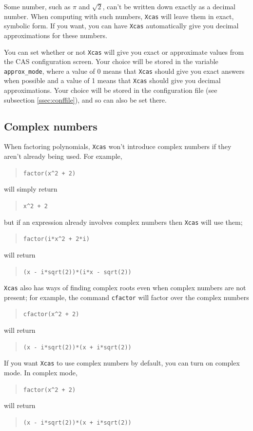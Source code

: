 \documentclass[a4paper,11pt]{book}
\newenvironment{giaccmd}
{\begin{quote}\ttfamily}
{\end{quote}}
\begin{document}
Some number, such as $\pi$ and $\sqrt{2}$, can't be written down
exactly as a decimal number.  When computing with such numbers,
\texttt{Xcas} will leave them in exact, symbolic form.  If you want,
you can have \texttt{Xcas} automatically give you decimal
approximations for these numbers.

You can set whether or not \texttt{Xcas} will give you exact or
approximate values from the CAS configuration screen.  Your choice will
be stored in the variable \texttt{approx\_mode}, where a value of 0
means that \texttt{Xcas} should give you exact answers when possible
and a value of 1 means that \texttt{Xcas} should give you decimal
approximations.  Your choice will be stored in the configuration file
(see subsection \ref{ssec:conffile}), and so can also be set there.

\subsection{Complex numbers}
\label{ssec:complex}

When factoring polynomials, \texttt{Xcas} won't introduce complex
numbers if they aren't already being used.  For example,
\begin{giaccmd}
  \texttt{factor(x\^{}2 + 2)}
\end{giaccmd}
will simply return
\begin{giaccmd}
  \texttt{x\^{}2 + 2}
\end{giaccmd}
but if an expression already involves complex numbers then
\texttt{Xcas} will use them;
\begin{giaccmd}
  \texttt{factor(i*x\^{}2 + 2*i)}
\end{giaccmd}
will return
\begin{giaccmd}
  \texttt{(x - i*sqrt(2))*(i*x - sqrt(2))}
\end{giaccmd}
\texttt{Xcas} also has ways of finding complex roots even when complex
numbers are not present; for example, the command \texttt{cfactor}
will factor over the complex numbers
\begin{giaccmd}
  \texttt{cfactor(x\^{}2 + 2)}
\end{giaccmd}
will return
\begin{giaccmd}
  \texttt{(x - i*sqrt(2))*(x + i*sqrt(2))}
\end{giaccmd}

If you want \texttt{Xcas} to use complex numbers by default, you can
turn on complex mode.  In complex mode,
\begin{giaccmd}
  \texttt{factor(x\^{}2 + 2)}
\end{giaccmd}
will return
\begin{giaccmd}
  \texttt{(x - i*sqrt(2))*(x + i*sqrt(2))}
\end{giaccmd}
\end{document}
